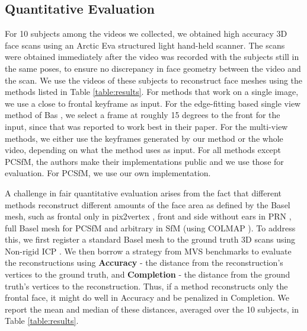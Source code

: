 \documentclass[10pt,twocolumn,letterpaper]{article}
\begin{document}
\subsection{Quantitative Evaluation} \label{sec:quant}

For 10 subjects among the videos we collected, we obtained high accuracy 3D face scans using an Arctic Eva structured light hand-held scanner. The scans were obtained immediately after the video was recorded with the subjects still in the same poses, to ensure no discrepancy in face geometry between the video and the scan. We use the videos of these subjects to reconstruct face meshes using the methods listed in Table \ref{table:results}. For methods that work on a single image, we use a close to frontal keyframe as input. For the edge-fitting based single view method of Bas \etal \cite{bas2016fitting}, we select a frame at roughly 15 degrees to the front for the input, since that was reported to work best in their paper. For the multi-view methods, we either use the keyframes generated by our method or the whole video, depending on what the method uses as input.
For all methods except PCSfM, the authors make their implementations public and we use those for evaluation. For PCSfM, we use our own implementation.

A challenge in fair quantitative evaluation arises from the fact that different methods reconstruct different amounts of the face area as defined by the Basel mesh, such as frontal only in pix2vertex \cite{sela2017unrestricted} , front and side without ears in PRN \cite{feng2018joint}, full Basel mesh for PCSfM \cite{hernandez2017accurate} and arbitrary in SfM (using COLMAP \cite{schonberger2016structure}). To address this, we first register a standard Basel mesh to the ground truth 3D scans using Non-rigid ICP \cite{amberg2007optimal,booth2018large}. We then borrow a strategy from MVS benchmarks \cite{jensen2014large,knapitsch2017tanks,yao2018mvsnet} to evaluate the reconstructions using \textbf{Accuracy} - the distance from the reconstruction's vertices to the ground truth, and \textbf{Completion} - the distance from the ground truth's vertices to the reconstruction. Thus, if a method reconstructs only the frontal face, it might do well in Accuracy and be penalized in Completion. We report the mean and median of these distances, averaged over the 10 subjects, in Table \ref{table:results}.
\end{document}
